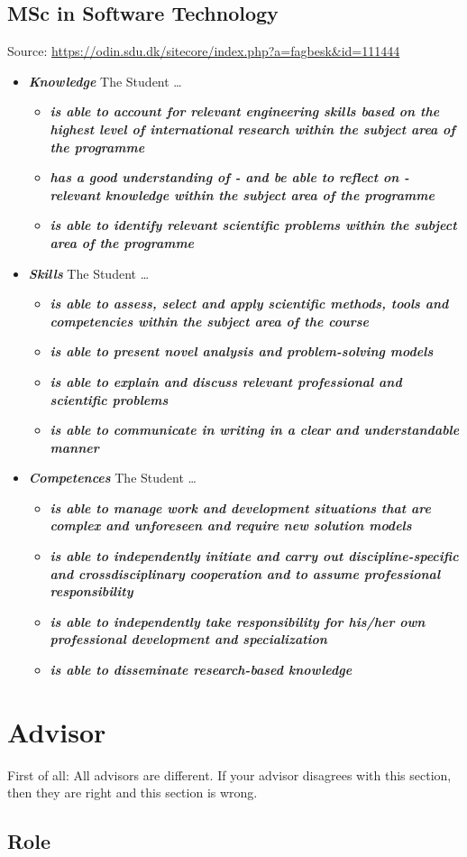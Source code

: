 \documentclass[a4paper, oneside]{memoir}
\newcommand{\textdesc}[1]{\textit{\textbf{#1}}}
\newcommand{\descitem}[1]{\item \textdesc{#1}}
\newcommand{\idx}[1]{\index{#1}\marginpar{\raggedright \tiny #1}}
\begin{document}
\subsection{MSc in Software Technology}
Source: \url{https://odin.sdu.dk/sitecore/index.php?a=fagbesk&id=111444}
\begin{itemize}
  \descitem{Knowledge} The Student \ldots
    \begin{itemize}
      \descitem{is able to account for relevant engineering skills based on the highest level of international research within the subject area of the programme}
      \descitem{has a good understanding of - and be able to reflect on - relevant knowledge within the subject area of the programme}
      \descitem{is able to identify relevant scientific problems within the subject area of the programme}
    \end{itemize}
  \descitem{Skills} The Student \ldots
    \begin{itemize}
      \descitem{is able to assess, select and apply scientific methods, tools and competencies within the subject area of the course}
      \descitem{is able to present novel analysis and problem-solving models}
      \descitem{is able to explain and discuss relevant professional and scientific problems}
      \descitem{is able to communicate in writing in a clear and understandable manner}
    \end{itemize}
  \descitem{Competences} The Student \ldots
    \begin{itemize}
      \descitem{is able to manage work and development situations that are complex and unforeseen and require new solution models}
      \descitem{is able to independently initiate and carry out discipline-specific and crossdisciplinary cooperation and to assume professional responsibility}
      \descitem{is able to independently take responsibility for his/her own professional development and specialization}
      \descitem{is able to disseminate research-based knowledge}
    \end{itemize}
\end{itemize}

\section{Advisor}

\idx{Advisor} First of all: All advisors are different. If your advisor disagrees with this section, then they are right and this section is wrong.

\subsection{Role}
\end{document}
